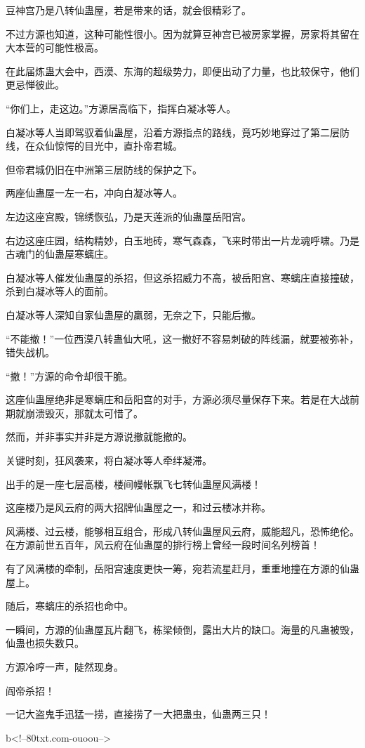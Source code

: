 \begin{this_body}
豆神宫乃是八转仙蛊屋，若是带来的话，就会很精彩了。

不过方源也知道，这种可能性很小。因为就算豆神宫已被房家掌握，房家将其留在大本营的可能性极高。

在此届炼蛊大会中，西漠、东海的超级势力，即便出动了力量，也比较保守，他们更忌惮彼此。

“你们上，走这边。”方源居高临下，指挥白凝冰等人。

白凝冰等人当即驾驭着仙蛊屋，沿着方源指点的路线，竟巧妙地穿过了第二层防线，在众仙惊愕的目光中，直扑帝君城。

但帝君城仍旧在中洲第三层防线的保护之下。

两座仙蛊屋一左一右，冲向白凝冰等人。

左边这座宫殿，锦绣恢弘，乃是天莲派的仙蛊屋岳阳宫。

右边这座庄园，结构精妙，白玉地砖，寒气森森，飞来时带出一片龙魂呼啸。乃是古魂门的仙蛊屋寒螭庄。

白凝冰等人催发仙蛊屋的杀招，但这杀招威力不高，被岳阳宫、寒螭庄直接撞破，杀到白凝冰等人的面前。

白凝冰等人深知自家仙蛊屋的羸弱，无奈之下，只能后撤。

“不能撤！”一位西漠八转蛊仙大吼，这一撤好不容易刺破的阵线漏，就要被弥补，错失战机。

“撤！”方源的命令却很干脆。

这座仙蛊屋绝非是寒螭庄和岳阳宫的对手，方源必须尽量保存下来。若是在大战前期就崩溃毁灭，那就太可惜了。

然而，并非事实并非是方源说撤就能撤的。

关键时刻，狂风袭来，将白凝冰等人牵绊凝滞。

出手的是一座七层高楼，楼间幔帐飘飞七转仙蛊屋风满楼！

这座楼乃是风云府的两大招牌仙蛊屋之一，和过云楼冰并称。

风满楼、过云楼，能够相互组合，形成八转仙蛊屋风云府，威能超凡，恐怖绝伦。在方源前世五百年，风云府在仙蛊屋的排行榜上曾经一段时间名列榜首！

有了风满楼的牵制，岳阳宫速度更快一筹，宛若流星赶月，重重地撞在方源的仙蛊屋上。

随后，寒螭庄的杀招也命中。

一瞬间，方源的仙蛊屋瓦片翻飞，栋梁倾倒，露出大片的缺口。海量的凡蛊被毁，仙蛊也损失数只。

方源冷哼一声，陡然现身。

阎帝杀招！

一记大盗鬼手迅猛一捞，直接捞了一大把蛊虫，仙蛊两三只！

b<!--80txt.com-ouoou-->

\end{this_body}

